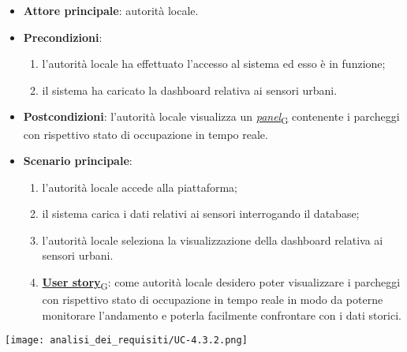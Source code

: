 \begin{itemize}
	\item \textbf{Attore principale}: autorità locale.
	\item \textbf{Precondizioni}:
	      \begin{enumerate}
		      \item l'autorità locale ha effettuato l'accesso al sistema ed esso è in funzione;
		      \item il sistema ha caricato la dashboard relativa ai sensori urbani.
	      \end{enumerate}
	\item \textbf{Postcondizioni}: l'autorità locale visualizza un \href{https://7last.github.io/docs/pb/documentazione-interna/glossario\#panel}{\textit{panel}\textsubscript{G}} contenente i parcheggi con rispettivo stato di occupazione in tempo reale.
	\item \textbf{Scenario principale}:
	      \begin{enumerate}
		      \item l'autorità locale accede alla piattaforma;
		      \item il sistema carica i dati relativi ai sensori interrogando il database;
		      \item l'autorità locale seleziona la visualizzazione della dashboard relativa ai sensori urbani.
		      \item \href{https://7last.github.io/docs/pb/documentazione-interna/glossario\#user-story}{\textbf{User story}\textsubscript{G}}:
		            come autorità locale desidero poter visualizzare i parcheggi con rispettivo stato di occupazione in tempo reale in modo da poterne monitorare l'andamento
		            e poterla facilmente confrontare con i dati storici.
	      \end{enumerate}
\end{itemize}
\begin{center}
	\texttt{[image: analisi\_dei\_requisiti/UC-4.3.2.png]}
\end{center}


